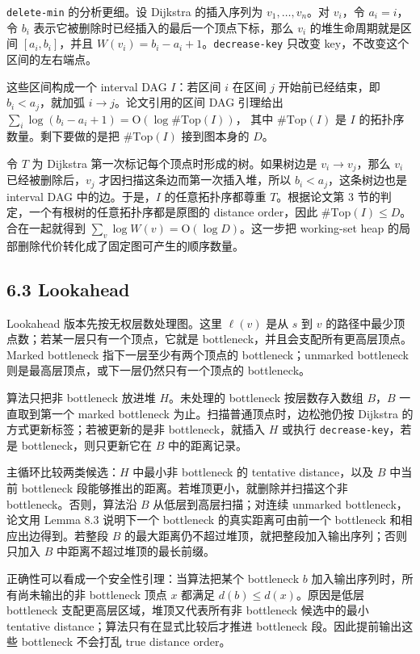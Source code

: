 \texttt{delete-\allowbreak{}min} 的分析更细。设 Dijkstra 的插入序列为 \(v_1,\ldots,v_n\)。对 \(v_i\)，令 \(a_i=i\)，令 \(b_i\) 表示它被删除时已经插入的最后一个顶点下标，那么 \(v_i\) 的堆生命周期就是区间 \([a_i,b_i]\)，并且 \(W(v_i)=b_i-a_i+1\)。\texttt{decrease-\allowbreak{}key} 只改变 key，不改变这个区间的左右端点。

这些区间构成一个 interval DAG \(I\)：若区间 \(i\) 在区间 \(j\) 开始前已经结束，即 \(b_i<a_j\)，就加弧 \(i\to j\)。论文引用的区间 DAG 引理给出 \(\sum_i \log(b_i-a_i+1)=\mathrm{O}(\log \#\mathrm{Top}(I))\)， 其中 \(\#\mathrm{Top}(I)\) 是 \(I\) 的拓扑序数量。剩下要做的是把 \(\#\mathrm{Top}(I)\) 接到图本身的 \(D\)。

令 \(T\) 为 Dijkstra 第一次标记每个顶点时形成的树。如果树边是 \(v_i\to v_j\)，那么 \(v_i\) 已经被删除后，\(v_j\) 才因扫描这条边而第一次插入堆，所以 \(b_i<a_j\)，这条树边也是 interval DAG 中的边。于是，\(I\) 的任意拓扑序都尊重 \(T\)。根据论文第 3 节的判定，一个有根树的任意拓扑序都是原图的 distance order，因此 \(\#\mathrm{Top}(I)\le D\)。合在一起就得到 \(\sum_v \log W(v)=\mathrm{O}(\log D)\)。这一步把 working-set heap 的局部删除代价转化成了固定图可产生的顺序数量。

\subsection*{6.3 Lookahead}
Lookahead 版本先按无权层数处理图。这里 \(\ell(v)\) 是从 \(s\) 到 \(v\) 的路径中最少顶点数；若某一层只有一个顶点，它就是 bottleneck，并且会支配所有更高层顶点。Marked bottleneck 指下一层至少有两个顶点的 bottleneck；unmarked bottleneck 则是最高层顶点，或下一层仍然只有一个顶点的 bottleneck。

算法只把非 bottleneck 放进堆 \(H\)。未处理的 bottleneck 按层数存入数组 \(B\)，\(B\) 一直取到第一个 marked bottleneck 为止。扫描普通顶点时，边松弛仍按 Dijkstra 的方式更新标签；若被更新的是非 bottleneck，就插入 \(H\) 或执行 \texttt{decrease-\allowbreak{}key}，若是 bottleneck，则只更新它在 \(B\) 中的距离记录。

主循环比较两类候选：\(H\) 中最小非 bottleneck 的 tentative distance，以及 \(B\) 中当前 bottleneck 段能够推出的距离。若堆顶更小，就删除并扫描这个非 bottleneck。否则，算法沿 \(B\) 从低层到高层扫描；对连续 unmarked bottleneck，论文用 Lemma 8.3 说明下一个 bottleneck 的真实距离可由前一个 bottleneck 和相应出边得到。若整段 \(B\) 的最大距离仍不超过堆顶，就把整段加入输出序列；否则只加入 \(B\) 中距离不超过堆顶的最长前缀。

正确性可以看成一个安全性引理：当算法把某个 bottleneck \(b\) 加入输出序列时，所有尚未输出的非 bottleneck 顶点 \(x\) 都满足 \(d(b)\le d(x)\)。原因是低层 bottleneck 支配更高层区域，堆顶又代表所有非 bottleneck 候选中的最小 tentative distance；算法只有在显式比较后才推进 bottleneck 段。因此提前输出这些 bottleneck 不会打乱 true distance order。

